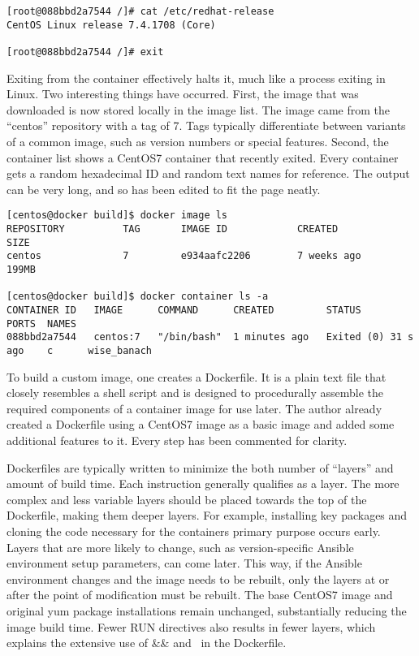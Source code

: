 \begin{verbatim}
[root@088bbd2a7544 /]# cat /etc/redhat-release 
CentOS Linux release 7.4.1708 (Core) 

[root@088bbd2a7544 /]# exit
\end{verbatim}

Exiting from the container effectively halts it, much like a process exiting
in Linux. Two interesting things have occurred. First, the image that was
downloaded is now stored locally in the image list. The image came from the
``centos'' repository with a tag of 7. Tags typically differentiate between
variants of a common image, such as version numbers or special features.
Second, the container list shows a CentOS7 container that recently exited.
Every container gets a random hexadecimal ID and random text names for
reference. The output can be very long, and so has been edited to fit the page
neatly.
 
\begin{verbatim}
[centos@docker build]$ docker image ls
REPOSITORY          TAG       IMAGE ID            CREATED             SIZE
centos              7         e934aafc2206        7 weeks ago         199MB

[centos@docker build]$ docker container ls -a
CONTAINER ID   IMAGE      COMMAND      CREATED         STATUS                 PORTS  NAMES
088bbd2a7544   centos:7   "/bin/bash"  1 minutes ago   Exited (0) 31 s ago    c      wise_banach
\end{verbatim}

To build a custom image, one creates a Dockerfile. It is a plain text file
that closely resembles a shell script and is designed to procedurally assemble
the required components of a container image for use later. The author already
created a Dockerfile using a CentOS7 image as a basic image and added some
additional features to it. Every step has been commented for clarity.

Dockerfiles are typically written to minimize the both number of ``layers'' and
amount of build time. Each instruction generally qualifies as a layer. The
more complex and less variable layers should be placed towards the top of the
Dockerfile, making them deeper layers. For example, installing key packages
and cloning the code necessary for the containers primary purpose occurs
early. Layers that are more likely to change, such as version-specific Ansible
environment setup parameters, can come later. This way, if the Ansible
environment changes and the image needs to be rebuilt, only the layers at or
after the point of modification must be rebuilt. The base CentOS7 image and
original yum package installations remain unchanged, substantially reducing
the image build time. Fewer RUN directives also results in fewer layers, which
explains the extensive use of \&\& and \ in the Dockerfile.

